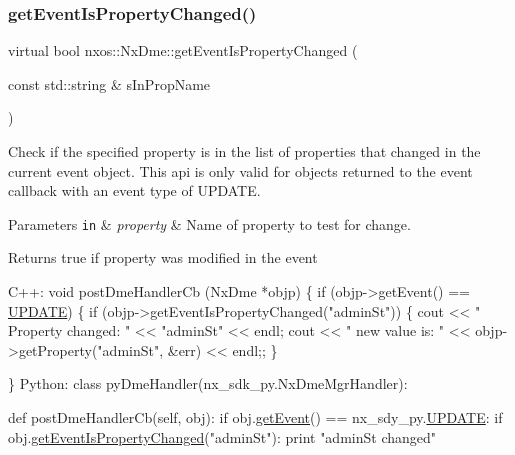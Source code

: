 \subsubsection{\texorpdfstring{get\+Event\+Is\+Property\+Changed()}{getEventIsPropertyChanged()}}
{\footnotesize\ttfamily virtual bool nxos\+::\+Nx\+Dme\+::get\+Event\+Is\+Property\+Changed (\begin{DoxyParamCaption}\item[{const std\+::string \&}]{s\+In\+Prop\+Name }\end{DoxyParamCaption})\hspace{0.3cm}{\ttfamily [pure virtual]}}

Check if the specified property is in the list of properties that changed in the current event object. This api is only valid for objects returned to the event callback with an event type of U\+P\+D\+A\+TE.


\begin{DoxyParams}[1]{Parameters}
\mbox{\tt in}  & {\em property} & Name of property to test for change. \\
\hline
\end{DoxyParams}
\begin{DoxyReturn}{Returns}
true if property was modified in the event 
\begin{DoxyCode}
C++:
    \textcolor{keywordtype}{void} postDmeHandlerCb (NxDme *objp)
    \{
       \textcolor{keywordflow}{if} (objp->getEvent() == \mbox{\hyperlink{nx__common_8h_af9a9040b7681199d386e94eb888018cba4f3a5ababd9a5356d642a492f5ccc371}{UPDATE}}) \{
         \textcolor{keywordflow}{if} (objp->getEventIsPropertyChanged(\textcolor{stringliteral}{"adminSt"})) \{
            cout << \textcolor{stringliteral}{" Property changed: "} << \textcolor{stringliteral}{"adminSt"} << endl;
            cout << \textcolor{stringliteral}{" new value is: "} <<
              objp->getProperty(\textcolor{stringliteral}{"adminSt"}, &err) << endl;;
        \}

     \}
Python:
    \textcolor{keyword}{class }pyDmeHandler(nx\_sdk\_py.NxDmeMgrHandler):

        def postDmeHandlerCb(self, obj):
           if obj.\mbox{\hyperlink{classnxos_1_1_nx_dme_aff302a3891e0b6f69e9e0fd26e6e16a7}{getEvent}}() == nx\_sdy\_py.\mbox{\hyperlink{nx__common_8h_af9a9040b7681199d386e94eb888018cba4f3a5ababd9a5356d642a492f5ccc371}{UPDATE}}:
               if obj.\mbox{\hyperlink{classnxos_1_1_nx_dme_a537141d11543c8e5c9e82b53255981cb}{getEventIsPropertyChanged}}("adminSt"):
                   print "adminSt changed"
\end{DoxyCode}

\end{DoxyReturn}

